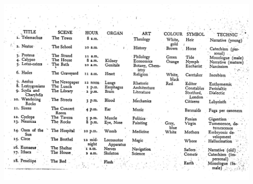 \documentclass[10pt]{report}
\begin{document}
			\begin{center}
				\includegraphics[width=0.7\linewidth]{"Inglese - Joyce/ulysses_scheme"}
			\end{center}
\end{document}
